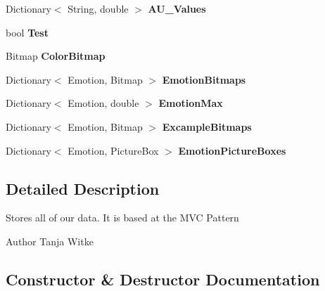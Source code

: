 \begin{DoxyCompactItemize}
Dictionary$<$ String, double $>$ {\bfseries A\+U\+\_\+\+Values}\hspace{0.3cm}{\ttfamily  [get, set]}
\item 
\mbox{\label{class_real_sense_1_1_model_a89f4614b0f880fb6553ebcea3d2e6a6c}} 
bool {\bfseries Test}\hspace{0.3cm}{\ttfamily  [get, set]}
\item 
\mbox{\label{class_real_sense_1_1_model_a6b3603d17577660f65fc7bbb6b097182}} 
Bitmap {\bfseries Color\+Bitmap}\hspace{0.3cm}{\ttfamily  [get]}
\item 
\mbox{\label{class_real_sense_1_1_model_a654d0ac6e4e49b884fd3e166039c7bc4}} 
Dictionary$<$ Emotion, Bitmap $>$ {\bfseries Emotion\+Bitmaps}\hspace{0.3cm}{\ttfamily  [get, set]}
\item 
\mbox{\label{class_real_sense_1_1_model_ac5454f63dfead405cd1d9c229cf6790f}} 
Dictionary$<$ Emotion, double $>$ {\bfseries Emotion\+Max}\hspace{0.3cm}{\ttfamily  [get, set]}
\item 
\mbox{\label{class_real_sense_1_1_model_afbdadf185ba37319705fd55d102c0cb4}} 
Dictionary$<$ Emotion, Bitmap $>$ {\bfseries Excample\+Bitmaps}\hspace{0.3cm}{\ttfamily  [get, set]}
\item 
\mbox{\label{class_real_sense_1_1_model_ad2c87f308e42010ca032deec5cfa5e0b}} 
Dictionary$<$ Emotion, Picture\+Box $>$ {\bfseries Emotion\+Picture\+Boxes}\hspace{0.3cm}{\ttfamily  [get, set]}
\end{DoxyCompactItemize}


\subsection{Detailed Description}
Stores all of our data. It is based at the M\+VC Pattern

\begin{DoxyAuthor}{Author}
Tanja Witke 
\end{DoxyAuthor}


\subsection{Constructor \& Destructor Documentation}
\mbox{\label{class_real_sense_1_1_model_a39349d1d9b1274a9fe28614e9ce215f3}} 
